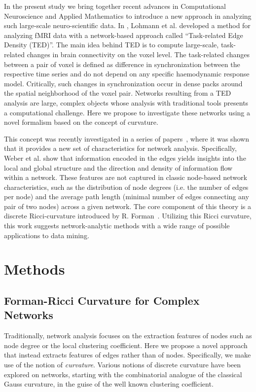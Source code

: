 \documentclass[english,11pt]{article}
\begin{document}
In the present study we bring together recent advances in Computational Neuroscience and Applied Mathematics to introduce
a new approach in analyzing such large-scale neuro-scientific data. In \cite{lohmann2016}, Lohmann et al. developed a method
for analyzing fMRI data with a network-based approach called ``Task-related Edge Density (TED)''.
The main idea behind TED is to compute large-scale, task-related changes
in brain connectivity on the voxel level. The task-related changes between a pair of voxel is defined as difference
in synchronization between the respective time series and do not depend on any specific haemodynamic response model.
Critically, such changes in synchronization occur in dense packs around the spatial neighborhood of the voxel pair.
Networks resulting from a TED analysis are large, complex objects whose analysis
with traditional tools presents a computational challenge. Here we propose to investigate these networks
using a novel formalism based on the concept of curvature.

This  concept was recently investigated in a series of papers~\cite{WSJ1,WSJ2,SSWJ}, where it was shown that
it provides a new set of characteristics for network analysis. Specifically, Weber et al. 
show that information encoded in the edges yields  insights into the local and global structure and
the direction and density of information flow within a network. These features are not captured in classic node-based
network characteristics, such as the distribution of node degrees (i.e. the number of edges per node) and the average
path length (minimal number of edges connecting any pair of two nodes) across a given network.
The core component of this theory is a discrete Ricci-curvature introduced by R. Forman~\cite{Forman}. Utilizing this Ricci curvature, 
this work suggests network-analytic methods with a wide range of possible applications to data mining. 


%

%


\section{Methods}

\subsection{Forman-Ricci Curvature for Complex Networks}

Traditionally, network analysis focuses on the extraction features of nodes such as 
node degree or the local clustering coefficient. 
Here we propose a novel approach that instead extracts features of edges rather than of nodes. Specifically,
we make use of the notion of {\em curvature}.  Various
notions of discrete curvature have been explored on networks, starting with the combinatorial analogue
of the classical Gauss curvature, in the guise of the well known clustering coefficient.
\end{document}
